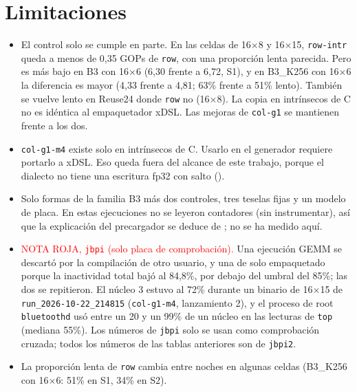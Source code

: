 \section{Limitaciones}
\begin{itemize}
  \item El control solo se cumple en parte. En las celdas de 16$\times$8 y 16$\times$15, \texttt{row-intr} queda a menos de 0,35 GOPs
  de \texttt{row}, con una proporción lenta parecida. Pero es más bajo en B3 con 16$\times$6 (6,30 frente a 6,72, S1), y en B3\_K256
  con 16$\times$6 la diferencia es mayor (4,33 frente a 4,81; 63\% frente a 51\% lento). También se vuelve lento en Reuse24 donde
  \texttt{row} no (16$\times$8). La copia en intrínsecos de C no es idéntica al empaquetador xDSL. Las mejoras de \texttt{col-g1} se
  mantienen frente a los dos.
  \item \texttt{col-g1-m4} existe solo en intrínsecos de C. Usarlo en el generador requiere portarlo a xDSL. Eso queda fuera del
  alcance de este trabajo, porque el dialecto no tiene una escritura fp32 con salto ().
  \item Solo formas de la familia B3 más dos controles, tres teselas fijas y un modelo de placa. En estas ejecuciones no se leyeron
  contadores (sin instrumentar), así que la explicación del precargador se deduce de ; no se ha medido aquí.
  \item \textcolor{red}{NOTA ROJA, \texttt{jbpi} (solo placa de comprobación).} Una ejecución GEMM se descartó por la compilación de
  otro usuario, y una de solo empaquetado porque la inactividad total bajó al 84,8\%, por debajo del umbral del 85\%; las dos se
  repitieron. El núcleo 3 estuvo al 72\% durante un binario de 16$\times$15 de \texttt{run\_2026-10-22\_214815} (\texttt{col-g1-m4},
  lanzamiento 2), y el proceso de root \texttt{bluetoothd} usó entre un 20 y un 99\% de un núcleo en las lecturas de \texttt{top}
  (mediana 55\%). Los números de \texttt{jbpi} solo se usan como comprobación cruzada; todos los números de las tablas anteriores son
  de \texttt{jbpi2}.
  \item La proporción lenta de \texttt{row} cambia entre noches en algunas celdas (B3\_K256 con 16$\times$6: 51\% en S1, 34\% en S2).
\end{itemize}

